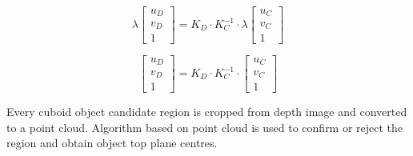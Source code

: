 \documentclass{ctuthesis}
\begin{document}
\[ \lambda \begin{bmatrix}
u_D\\
v_D\\
1
\end{bmatrix} = K_D \cdot K_C^{-1} \cdot \lambda \begin{bmatrix}
u_C\\
v_C\\
1
\end{bmatrix} \]

\[ \begin{bmatrix}
u_D\\
v_D\\
1
\end{bmatrix} = K_D \cdot K_C^{-1} \cdot \begin{bmatrix}
u_C\\
v_C\\
1
\end{bmatrix} \]



Every cuboid object candidate region is cropped from depth image and converted to a point cloud. Algorithm based on point cloud is used to confirm or reject the region and obtain object top plane centres. 
\end{document}
